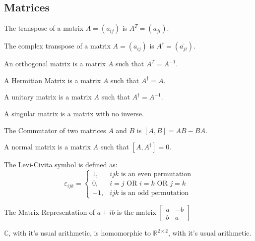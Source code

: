 \documentclass[crop=false,class=book]{standalone}
\begin{document}
\subsection{Matrices}
\begin{definition}
The transpose of a matrix $A = (a_{ij})$ is $A^{T} = (a_{ji})$.
\end{definition}
\begin{definition}
The complex transpose of a matrix $A = (a_{ij})$ is $A^{\dagger} = (\overline{a_{ji}})$.
\end{definition}
\begin{definition}
An orthogonal matrix is a matrix $A$ such that $A^T = A^{-1}$.
\end{definition}
\begin{definition}
A Hermitian Matrix is a matrix $A$ such that $A^{\dagger} = A$.
\end{definition}
\begin{definition}
A unitary matrix is a matrix $A$ such that $A^{\dagger} = A^{-1}$.
\end{definition}
\begin{definition}
A singular matrix is a matrix with no inverse.
\end{definition}
\begin{definition}
The Commutator of two matrices $A$ and $B$ is $[A,B] = AB - BA$.
\end{definition}
\begin{definition}
A normal matrix is a matrix $A$ such that $[A,A^{\dagger}] = 0$.
\end{definition}
\begin{definition}
The Levi-Civita symbol is defined as:
\begin{equation*}
    \varepsilon_{ijk} = \begin{cases} 1, & ijk\textrm{ is an even permutation} \\ 0, & i=j\textrm{ OR }i=k\textrm{ OR }j=k\\ -1, & ijk\textrm{ is an odd permutation}\end{cases}
\end{equation*}
\end{definition}
\begin{definition}
The Matrix Representation of $a+ib$ is the matrix $\begin{bmatrix}a & -b \\ b & a \end{bmatrix}$
\end{definition}
\begin{theorem}
$\mathbb{C}$, with it's usual arithmetic, is homomorphic to $\mathbb{R}^{2\times 2}$, with it's usual arithmetic.
\end{theorem}
\end{document}
